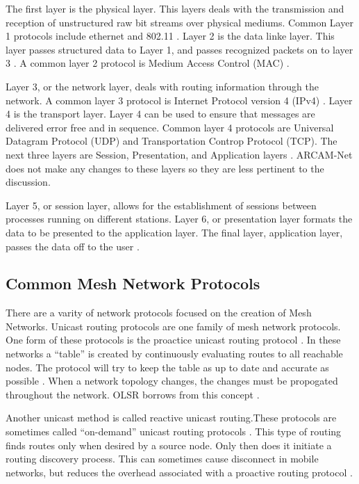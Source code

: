 The first layer is the physical layer. This layers deals with the transmission and reception of unstructured raw bit streams over physical mediums. Common Layer 1 protocols include ethernet and 802.11 \cite{0030}. Layer 2 is the data linke layer. This layer passes structured data to Layer 1, and passes recognized packets on to layer 3 \cite{0031}. A common layer 2 protocol is Medium Access Control (MAC) \cite{0030}. 

Layer 3, or the network layer, deals with routing information through the network. A common layer 3 protocol is Internet Protocol version 4 (IPv4) \cite{0031}. Layer 4 is the transport layer. Layer 4 can be used to ensure that messages are delivered error free and in sequence. Common layer 4 protocols are Universal Datagram Protocol (UDP) and Transportation Controp Protocol (TCP). The next three layers are Session, Presentation, and Application layers \cite{0030}. ARCAM-Net does not make any changes to these layers so they are less pertinent to the discussion. 

Layer 5, or session layer, allows for the establishment of sessions between processes running on different stations. Layer 6, or presentation layer formats the data to be presented to the application layer. The final layer, application layer, passes the data off to the user \cite{0030}. 

\subsection{Common Mesh Network Protocols}

There are a varity of network protocols focused on the creation of Mesh Networks. Unicast routing protocols are one family of mesh network protocols. One form of these protocols is the proactice unicast routing protocol \cite{4796928}. In these networks a ``table'' is created by continuously evaluating routes to all reachable nodes. The protocol will try to keep the table as up to date and accurate as possible \cite{4796928}. When a network topology changes, the changes must be propogated throughout the network. OLSR borrows from this concept \cite{0033} \cite{5375690}. 

Another unicast method is called reactive unicast routing.These protocols are sometimes called ``on-demand'' unicast routing protocols \cite{4796928}. This type of routing finds routes only when desired by a source node. Only then does it initiate a routing discovery process. This can sometimes cause disconnect in mobile networks, but reduces the overhead associated with a proactive routing protocol \cite{0033}.

